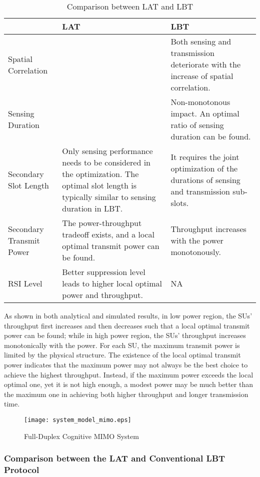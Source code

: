 \documentclass[onecolumn,12pt]{IEEEtran}
\begin{document}
\begin{table}[t]
\renewcommand{\arraystretch}{1.3}
\caption{Comparison between LAT and LBT} \label{Comparison}
\centering
\begin{tabular}{|p{4cm}<{\centering}|p{6.5cm}<{\centering}|p{6.5cm}<{\centering}|}
\hline
\centering{Parameters} & LAT & LBT \\ \hline
Spatial Correlation & \centering{NA} & Both sensing and transmission deteriorate with the increase of spatial correlation. \\ \hline
Sensing Duration & \centering{NA} & Non-monotonous impact. An optimal ratio of sensing duration can be found\cite{liang2008twc}. \\ \hline
Secondary Slot Length & Only sensing performance needs to be considered in the optimization. The optimal slot length is typically similar to sensing duration in LBT. & It requires the joint optimization of the durations of sensing and transmission sub-slots. \\ \hline
Secondary Transmit Power & The power-throughput tradeoff exists, and a local optimal transmit power can be found. & Throughput increases with the power monotonously. \\ \hline
RSI Level & Better suppression level leads to higher local optimal power and throughput. & NA\\
 \hline
\end{tabular}
\end{table}

As shown in both analytical and simulated results, in low power region, the SUs' throughput first increases and then decreases such that a local optimal transmit power can be found; while in high power region, the SUs' throughput increases monotonically with the power. For each SU, the maximum transmit power is limited by the physical structure. The existence of the local optimal transmit power indicates that the maximum power may not always be the best choice to achieve the highest throughput. Instead, if the maximum power exceeds the local optimal one, yet it is not high enough, a modest power may be much better than the maximum one in achieving both higher throughput and longer transmission time.

\begin{figure}[h]
\centering
\texttt{[image: system\_model\_mimo.eps]}
\caption{Full-Duplex Cognitive MIMO System}
\label{mimo}
\end{figure}

\subsubsection{Comparison between the LAT and Conventional LBT Protocol}
\end{document}
